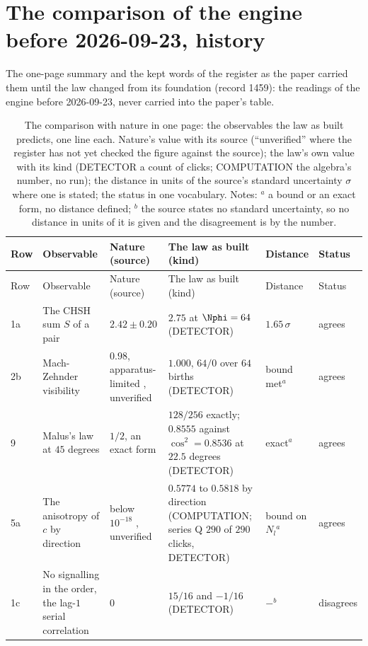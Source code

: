 \section{The comparison of the engine before 2026-09-23, history}\label{rec:oldcomparison}

The one-page summary and the kept words of the register as the paper carried them until the law changed from its foundation (record 1459): the readings of the engine before 2026-09-23, never carried into the paper's table.

{\scriptsize\setlength{\tabcolsep}{3pt}
\begin{longtable}{L{0.3in}L{1.35in}L{1.4in}L{1.5in}L{0.55in}L{0.75in}}
\caption{\label{tab:summary}The comparison with nature in one page: the observables the law as built predicts, one line each. Nature's value with its source (``unverified'' where the register has not yet checked the figure against the source); the law's own value with its kind (DETECTOR a count of clicks; COMPUTATION the algebra's number, no run); the distance in units of the source's standard uncertainty $\sigma$ where one is stated; the status in one vocabulary. Notes: $^{a}$ a bound or an exact form, no distance defined; $^{b}$ the source states no standard uncertainty, so no distance in units of it is given and the disagreement is by the number.}\\
\toprule
Row & Observable & Nature (source) & The law as built (kind) & Distance & Status \\
\midrule
\endfirsthead
\toprule
Row & Observable & Nature (source) & The law as built (kind) & Distance & Status \\
\midrule
\endhead
\bottomrule
\endlastfoot
1a & The CHSH sum $S$ of a pair & $2.42 \pm 0.20$ \cite{hensen2015} & $2.75$ at $\Nphi = 64$ (DETECTOR) & $1.65\,\sigma$ & agrees \\
2b & Mach-Zehnder visibility & $0.98$, apparatus-limited \cite{grangier1986}, unverified & $1.000$, $64/0$ over $64$ births (DETECTOR) & bound met$^{a}$ & agrees \\
9 & Malus's law at $45$ degrees & $1/2$, an exact form & $128/256$ exactly; $0.8555$ against $\cos^2 = 0.8536$ at $22.5$ degrees (DETECTOR) & exact$^{a}$ & agrees \\
5a & The anisotropy of $c$ by direction & below $10^{-18}$ \cite{nagel2015}, unverified & $0.5774$ to $0.5818$ by direction (COMPUTATION; series Q $290$ of $290$ clicks, DETECTOR) & bound on $N_l$$^{a}$ & agrees \\
1c & No signalling in the order, the lag-$1$ serial correlation & $0$ & $15/16$ and $-1/16$ (DETECTOR) & $-$$^{b}$ & disagrees \\

\end{longtable}}
